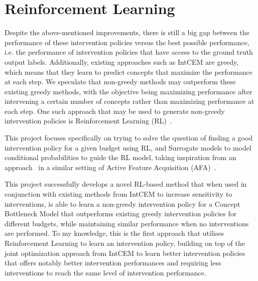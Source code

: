 \documentclass[../main.tex]{subfiles}
\begin{document}
\section{Reinforcement Learning}
Despite the above-mentioned improvements, there is still a big gap between the
performance
of these intervention policies versus the best possible performance, i.e. the performance of 
intervention policies that have access to the ground truth output labels.
Additionally, existing approaches such as IntCEM are greedy, which means that
they learn to predict concepts that maximize the performance at each step.
We speculate that non-greedy methods may outperform 
these existing greedy methods, with the objective being maximizing 
performance after intervening a certain number of concepts rather than maximizing 
performance at each step. 
One such approach that may be used to generate non-greedy intervention policies 
is Reinforcement Learning (RL)~\cite{rl}.

This project focuses specifically on trying to solve the 
question of finding a good intervention policy for a given 
budget using RL, and Surrogate models to model conditional 
probabilities to guide the RL model, taking inspiration
from an approach~\cite{gsmrl} in a similar setting of
Active Feature Acquisition (AFA)~\cite{afa}.

This project successfully develops a novel RL-based method
that when used in conjunction with
existing methods from IntCEM to increase sensitivity
to interventions, is able to learn a non-greedy intervention policy
for a Concept Bottleneck Model that outperforms
existing 
greedy intervention policies for different budgets, 
while maintaining similar performance
when no interventions are performed. To my knowledge,
this is the first approach that utilises Reinforcement Learning
to learn an intervention policy, building on top of the
joint optimization approach from IntCEM to learn better intervention
policies that offers notably better intervention performances and
requiring less interventions to reach the same level of intervention performance.
\end{document}
